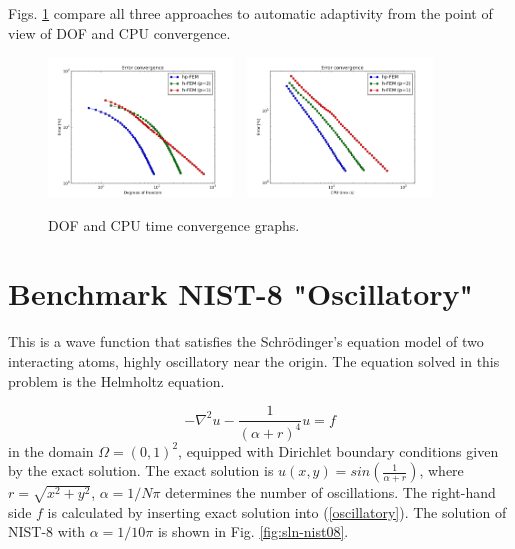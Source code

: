 \documentclass[12pt]{elsarticle}
\begin{document}
Figs. \ref{fig:nist-7-conv} compare all
three approaches to automatic adaptivity from the point
of view of DOF and CPU convergence.

\begin{figure}[H]
\centering
\vspace{-5mm}
\includegraphics[height=3.7cm]{nist/nist-7/conv_dof_aniso.png}\ \
\includegraphics[height=3.7cm]{nist/nist-7/conv_cpu_aniso.png}
\vspace{-5mm}
\caption{DOF and CPU time convergence graphs.}
\vspace{-5mm}
\label{fig:nist-7-conv}
\end{figure}


\section{Benchmark NIST-8 "Oscillatory"}
\label{sec:bench-8}

This is a wave function that satisfies the Schr\"{o}dinger's equation model of two
interacting atoms, highly oscillatory near the origin.
The equation solved in this problem is the Helmholtz equation.

\begin{equation} \label{oscillatory}
-\nabla^{2} u - \frac{1}{(\alpha + r)^{4}} u = f
\end{equation}
in the domain $\Omega = (0, 1)^2$, equipped with Dirichlet boundary conditions
given by the exact solution. The exact solution is
$u(x,y) = sin(\frac{1}{\alpha + r})$,
where $r = \sqrt{x^{2} + y^{2}}$, $\alpha = 1 / N \pi$ determines the number of oscillations.
The right-hand side $f$ is calculated by inserting exact solution into (\ref{oscillatory}).
The solution of NIST-8 with $\alpha = 1 / 10 \pi$ is shown in Fig. \ref{fig:sln-nist08}.
\end{document}
